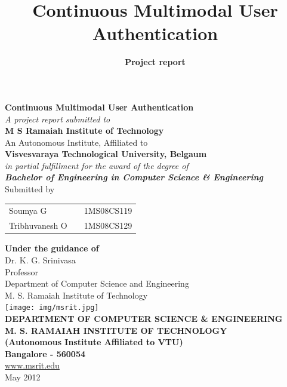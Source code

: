 \documentclass[12pt]{report}			%
\title{Continuous Multimodal User Authentication}	%
\author{{\bf Project report}{\bf}}
\date{}				%
\begin{document}

\begin{singlespacing}
\thispagestyle{empty}			%

\begin{center}

\thisfancypage{%
\setlength{\fboxsep}{9pt}%
\setlength{\shadowsize}{8pt}%
\doublebox}{}
\textbf{\Large Continuous Multimodal User Authentication}\\[4ex]
\textit{\large A project report submitted to}\\[2ex]
\textbf{\Large M S Ramaiah Institute of Technology}\\[2ex]
An Autonomous Institute, Affiliated to\\[2ex]
\textbf{Visvesvaraya Technological University, Belgaum}\\[2ex]
\textit{in partial fulfillment for the award of the degree of}\\[2ex]
\textbf{\textit{\large Bachelor of Engineering in Computer Science \& Engineering}}\\[4ex]
Submitted by\\[2ex]
\begin{table}[htp]
	\centering
	\begin{tabular}{lcc}
	Soumya G       &  \hspace{20 mm} & 1MS08CS119             \\
	Tribhuvanesh O &  \hspace{20 mm} & 1MS08CS129             \\ 
	\end{tabular}
\end{table}

{\bf Under the guidance of }{\bf}\\[2ex]
Dr. K. G. Srinivasa\\
Professor\\
Department of Computer Science and Engineering\\
M. S. Ramaiah Institute of Technology\\[3ex]


\texttt{[image: img/msrit.jpg]}\\
\uppercase{\textbf{Department of Computer Science \& Engineering}}\\[2ex]
\uppercase{\textbf{M. S. Ramaiah Institute of Technology}}\\
\textbf{(Autonomous Institute Affiliated to VTU)}\\
\textbf{Bangalore - 560054}\\
\url{www.msrit.edu}\\
{May 2012}
\end{center}
\end{singlespacing}
\newpage
\end{document}

